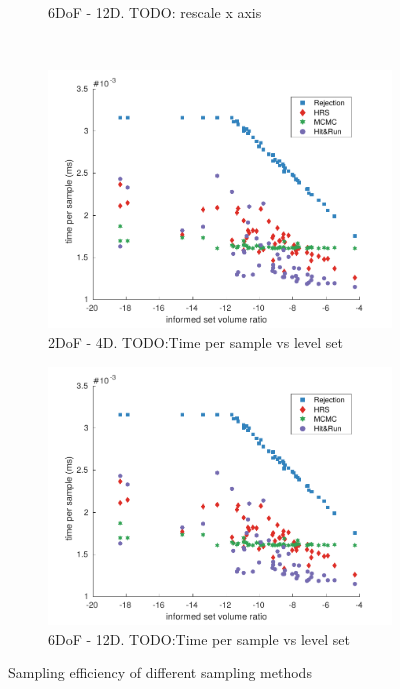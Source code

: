 \documentclass[letterpaper, 10 pt, conference]{ieeeconf}  %
\begin{document}
\begin{figure}[t!]
\begin{subfigure}[b]{0.32\textwidth}
		\caption{6DoF - 12D. TODO: rescale x axis}
		\label{fig:sampling_efficiency:6d}
	\end{subfigure}\\
	\begin{subfigure}[b]{0.32\textwidth}
		\includegraphics[width=\linewidth]{fig/sampling_efficiency/sample_efficiency_6d}
		\caption{2DoF - 4D. TODO:Time per sample vs level set}
		\label{fig:sampling_efficiency:6d}
	\end{subfigure}
	\begin{subfigure}[b]{0.32\textwidth}
		\includegraphics[width=\linewidth]{fig/sampling_efficiency/sample_efficiency_6d}
		\caption{6DoF - 12D. TODO:Time per sample vs level set}
		\label{fig:sampling_efficiency:6d}
	\end{subfigure}
	\caption{\captionstyle Sampling efficiency of different sampling methods}
	\label{fig:sampling_efficiency}
\end{figure} 
\end{document}
